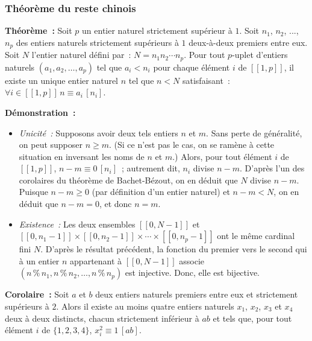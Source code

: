     \done

\subsubsection{Théorème du reste chinois}

\medskip

\noindent\textbf{Théorème :} Soit $p$ un entier naturel strictement supérieur à $1$. Soit $n_1$, $n_2$, ..., $n_p$ des entiers naturels strictement supérieurs à $1$ deux-à-deux premiers entre eux. 
Soit $N$ l'entier naturel défini par : $N = n_1 n_2 \cdots n_p$. 
Pour tout $p$-uplet d'entiers naturels $(a_1, a_2, \dots, a_p)$ tel que $a_i < n_i$ pour chaque élément $i$ de $[\![1,p]\!]$, il existe un unique entier naturel $n$ tel que $n < N$ satisfaisant : $\forall i \in [\![1,p]\!] \, n \equiv a_i \, [n_i]$.

\medskip

\noindent\textbf{Démonstration :} 
\begin{itemize}
    \item \textit{Unicité :} Supposons avoir deux tels entiers $n$ et $m$. 
    Sans perte de généralité, on peut supposer $n \geq m$. 
    (Si ce n'est pas le cas, on se ramène à cette situation en inversant les noms de $n$ et $m$.)
    Alors, pour tout élément $i$ de $[\![1,p]\!]$, $n-m \equiv 0 \, [n_i]$ ; autrement dit, $n_i$ divise $n-m$. 
    D'après l'un des corolaires du théorème de Bachet-Bézout, on en déduit que $N$ divise $n-m$. 
    Puisque $n-m \geq 0$ (par définition d'un entier naturel) et $n-m < N$, on en déduit que $n-m=0$, et donc $n=m$.
    \item \textit{Existence :} Les deux ensembles $[\![0, N-1]\!]$ et $[\![0, n_1-1]\!] \times [\![0, n_2-1]\!] \times \cdots \times [\![0, n_p-1]\!]$ ont le même cardinal fini $N$. D'après le résultat précédent, la fonction du premier vers le second qui à un entier $n$ appartenant à $[\![0,N-1]\!]$ associe $(n \mathrel{\%} n_1, n \mathrel{\%} n_2, \dots, n \mathrel{\%} n_p)$ est injective. Donc, elle est bijective.
\end{itemize}

\done

\medskip

\noindent\textbf{Corolaire :} Soit $a$ et $b$ deux entiers naturels premiers entre eux et strictement supérieurs à $2$. Alors il existe au moins quatre entiers naturels $x_1$, $x_2$, $x_3$ et $x_4$ deux à deux distincts, chacun strictement inférieur à $ab$ et tels que, pour tout élément $i$ de $\lbrace 1, 2, 3, 4 \rbrace$, $x_i^2 \equiv 1 \, [a b]$.

